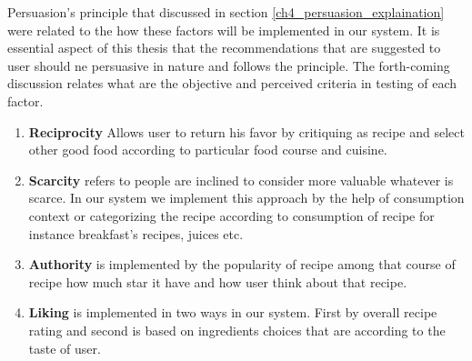 Persuasion’s principle that discussed in section \ref{ch4_persuasion_explaination} were related to the how these factors will be implemented in our system.  It is essential aspect of this thesis that the recommendations that are suggested to user should ne persuasive in nature and follows the principle. The forth-coming discussion relates what are the objective and perceived criteria in testing of each factor.



  \begin{enumerate}
  	\item \textbf{Reciprocity} Allows user to return his favor by critiquing as recipe and select other good food according to particular food course and cuisine.
  	
  	
  	\item \textbf{Scarcity} refers to people are inclined to consider more valuable whatever is scarce. In our system we implement this approach by the help of consumption context or categorizing the recipe according to consumption of recipe for instance breakfast’s recipes, juices etc. 
  	
  	\item \textbf{Authority}  is implemented by the popularity of recipe among that course of recipe how much star it have and how user think about that  recipe.
  	  	  
  	\item \textbf{Liking} is implemented in two ways in our system. First by overall recipe rating and second is based on ingredients choices that are according to the taste of user.  	  
  	

\end{enumerate}
